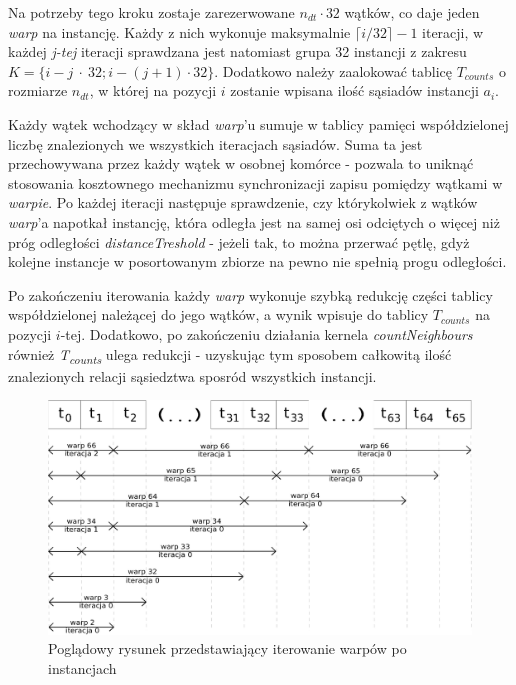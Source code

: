 \documentclass[12pt]{article}
\begin{document}
Na potrzeby tego kroku zostaje zarezerwowane $ n_{dt} \cdot 32 $ wątków, co daje jeden \textit{warp} na instancję. Każdy z nich wykonuje maksymalnie $\lceil i / 32\rceil - 1$ iteracji, w każdej \textit{j-tej} iteracji sprawdzana jest natomiast grupa 32 instancji z zakresu $ K=\{i - j~\cdot~32; i - (j + 1) \cdot 32\} $. Dodatkowo należy zaalokować tablicę $ T_{counts} $ o rozmiarze $ n_{dt} $, w której na pozycji $ i $ zostanie wpisana ilość sąsiadów instancji $ a_{i} $.

Każdy wątek wchodzący w skład \textit{warp}'u sumuje w tablicy pamięci współdzielonej liczbę znalezionych we wszystkich iteracjach sąsiadów. Suma ta jest przechowywana przez każdy wątek w osobnej komórce - pozwala to uniknąć stosowania kosztownego mechanizmu synchronizacji zapisu pomiędzy wątkami w \textit{warpie}. Po każdej iteracji następuje sprawdzenie, czy którykolwiek z wątków \textit{warp}'a napotkał instancję, która odległa jest na samej osi odciętych o więcej niż próg odległości \textit{distanceTreshold} - jeżeli tak, to można przerwać pętlę, gdyż kolejne instancje w posortowanym zbiorze na pewno nie spełnią progu odległości.

Po zakończeniu iterowania każdy \textit{warp} wykonuje szybką redukcję części tablicy współdzielonej należącej do jego wątków, a wynik wpisuje do tablicy \textit{$ T_{counts} $} na pozycji $i$-tej. Dodatkowo, po zakończeniu działania kernela  \textit{countNeighbours} również \textit{T\textsubscript{counts}} ulega redukcji - uzyskując tym sposobem całkowitą ilość znalezionych relacji sąsiedztwa sposród wszystkich instancji.


\begin{figure}[H]
\centering
\includegraphics[width=\textwidth]{planesweep.eps}
\caption{Poglądowy rysunek przedstawiający iterowanie warpów po instancjach}
\end{figure}
\end{document}
